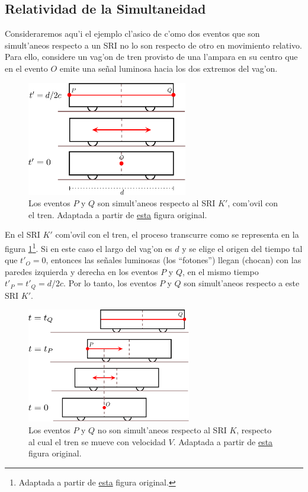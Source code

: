 \subsection{Relatividad de la Simultaneidad}
Consideraremos aqu'i el ejemplo cl'asico de c'omo dos eventos que son simult'aneos respecto a un SRI no lo son respecto de otro en movimiento relativo. Para ello, considere un vag'on de tren provisto de una l'ampara en su centro que en el evento $O$ emite una se\~nal luminosa hacia los dos extremos del vag'on.
\begin{figure}[H]
\centerline{\includegraphics[height= 5cm]{fig/fig-diagrama-simultaneidad-01.pdf}}
\caption{Los eventos $P$ y $Q$ son simult'aneos respecto al SRI $K'$, com'ovil con el tren. Adaptada a partir de \href{https://commons.wikimedia.org/wiki/File:Traincar_Relativity1.svg}{esta} figura original.}
\label{sim01}
\end{figure}
En el SRI $K'$ com'ovil con el tren, el proceso transcurre como se representa en la figura \ref{sim01}\footnote{Adaptada a partir de  \href{http://commons.wikimedia.org/wiki/File:Traincar_Relativity1.svg}{esta} figura original.}. Si en este caso el largo del vag'on es $d$ y se elige el origen del tiempo tal que $t'_O=0$, entonces las se\~nales luminosas (los ``fotones'') llegan (chocan) con las paredes izquierda y derecha en los eventos $P$ y $Q$, en el mismo tiempo $t'_P=t'_Q=d/2c$. Por lo tanto, los eventos $P$ y $Q$ son simult'aneos respecto a este SRI $K'$.
\begin{figure}[H]
\centerline{\includegraphics[height= 5cm]{fig/fig-diagrama-simultaneidad-02.pdf}}
\caption{Los eventos $P$ y $Q$ no son simult'aneos respecto al SRI $K$, respecto al cual el tren se mueve con velocidad $V$. Adaptada a partir de \href{https://commons.wikimedia.org/wiki/File:Traincar_Relativity2.svg}{esta} figura original.}
\label{sim02}
\end{figure}

